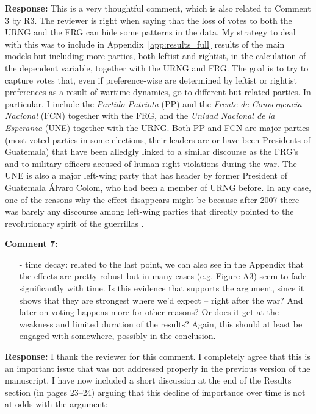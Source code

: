 \documentclass[12pt, a4paper, notitlepage]{article}
\begin{document}
\noindent\textbf{Response:} This is a very thoughtful comment, which is also related to Comment 3 by R3. The reviewer is right when saying that the loss of votes to both the URNG and the FRG can hide some patterns in the data. My strategy to deal with this was to include in Appendix~\ref{app:results_full} results of the main models but including more parties, both leftist and rightist, in the calculation of the dependent variable, together with the URNG and FRG.
The goal is to try to capture votes that, even if preference-wise are determined by leftist or rightist preferences as a result of wartime dynamics, go to different but related parties.
In particular, I include the \textit{Partido Patriota} (PP) and the \textit{Frente de Convergencia Nacional} (FCN) together with the FRG, and the \textit{Unidad Nacional de la Esperanza} (UNE) together with the URNG.
Both PP and FCN are major parties (most voted parties in some elections, their leaders are or have been Presidents of Guatemala) that have been alledgly linked to a similar discourse as the FRG's and to military officers accused of human right violations during the war.
The UNE is also a major left-wing party that has header by former President of Guatemala Álvaro Colom, who had been a member of URNG before.
In any case, one of the reasons why the effect disappears might be because after 2007 there was barely any discourse among left-wing parties that directly pointed to the revolutionary spirit of the guerrillas \citep{Ibarra:2008to}.

\vspace{15pt}
\noindent\textbf{Comment 7:}
\begin{displayquote}
\begin{itemize}
\item[-] time decay: related to the last point, we can also see in the Appendix that the effects are pretty robust but in many cases (e.g. Figure A3) seem to fade significantly with time. Is this evidence that supports the argument, since it shows that they are strongest where we’d expect – right after the war? And later on voting happens more for other reasons? Or does it get at the weakness and limited duration of the results? Again, this should at least be engaged with somewhere, possibly in the conclusion.
\end{itemize}
\end{displayquote}

\noindent\textbf{Response:} I thank the reviewer for this comment. I completely agree that this is an important issue that was not addressed properly in the previous version of the manuscript. I have now included a short discussion at the end of the Results section (in pages 23--24) arguing that this decline of importance over time is not at odds with the argument:
\end{document}
